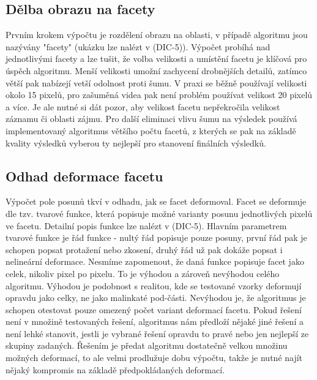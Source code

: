 \documentclass[a4paper,12pt]{article}
\begin{document}
\subsection{Dělba obrazu na facety}
Prvním krokem výpočtu je rozdělení obrazu na oblasti, v případě algoritmu jsou nazývány "facety" (ukázku lze nalézt v (DIC-5)). Výpočet probíhá nad jednotlivými facety a lze tušit, že volba velikosti a umístění facetu je klíčová pro úspěch algoritmu. Menší velikosti umožní zachycení drobnějších detailů, zatímco větší pak nabízejí vetší odolnost proti šumu. V praxi se běžně používají velikosti okolo 15 pixelů, pro zašuměná videa pak není problém používat velikost 20 pixelů a více. Je ale nutné si dát pozor, aby velikost facetu nepřekročila velikost záznamu či oblasti zájmu. Pro další eliminaci vlivu šumu na výsledek používá implementovaný algoritmus většího počtu facetů, z kterých se pak na základě kvality výsledků vyberou ty nejlepší pro stanovení finálních výsledků.
\subsection{Odhad deformace facetu}
Výpočet pole posunů tkví v odhadu, jak se facet deformoval. Facet se deformuje dle tzv. tvarové funkce, která popisuje možné varianty posunu jednotlivých pixelů ve facetu. Detailní popis funkce lze nalézt v (DIC-5). Hlavním parametrem tvarové funkce je řád funkce - nultý řád popisuje pouze posuny, první řád pak je schopen popsat protažení nebo zkosení, druhý řád už pak dokáže popsat i nelineární deformace. Nesmíme zapomenout, že daná funkce popisuje facet jako celek, nikoliv pixel po pixelu. To je výhodou a zároveň nevýhodou celého algoritmu. Výhodou je podobnost s realitou, kde se testované vzorky deformují opravdu jako celky, ne jako malinkaté pod-části. Nevýhodou je, že algoritmus je schopen otestovat pouze omezený počet variant deformací facetu. Pokud řešení není v množině testovaných řešení, algoritmus nám předloží nějaké jiné řešení a není lehké stanovit, jestli je vybrané řešení opravdu to pravé nebo jen nejlepší ze skupiny zadaných. Řešením je předat algoritmu dostatečně velkou množinu možných deformací, to ale velmi prodlužuje dobu výpočtu, takže je nutné najít nějaký kompromis na základě předpokládaných deformací.
\end{document}
